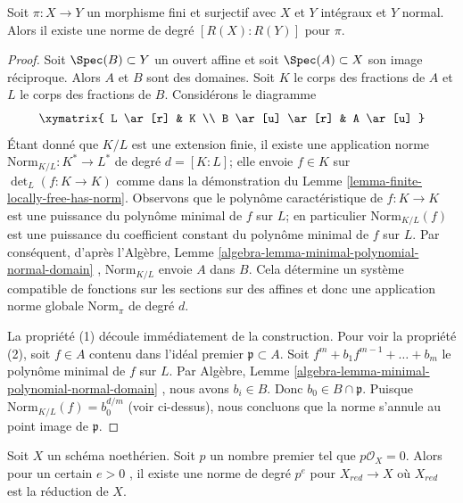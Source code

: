 \begin{lemma}
\label{lemma-norm-in-normal-case}
Soit  $\pi : X \to Y$  un morphisme fini et surjectif avec  $X$  et  $Y$ 
intégraux et  $Y$  normal. Alors il existe une norme de degré  $[R(X) : R(Y)]$ 
pour  $\pi$.
\end{lemma}

\begin{proof}
Soit  $\Spec(B) \subset Y$  un ouvert affine et soit  $\Spec(A) \subset X$  son image réciproque.
Alors  $A$  et  $B$  sont des domaines. Soit  $K$  le corps
des fractions de  $A$  et  $L$  le corps des fractions de
 $B$. Considérons le diagramme
$$
\xymatrix{
L \ar[r] & K \\
B \ar[u] \ar[r] & A \ar[u]
}
$$
Étant donné que  $K/L$  est une extension finie, il existe une application
norme  $\text{Norm}_{K/L} : K^* \to L^*$  de degré  $d = [K : L]$; elle envoie  $f \in K$ 
sur  $\det_L(f : K \to K)$  comme dans la démonstration du Lemme  \ref{lemma-finite-locally-free-has-norm}. Observons que
le polynôme caractéristique de  $f : K \to K$  est une puissance du polynôme minimal
de  $f$  sur  $L$; en particulier  $\text{Norm}_{K/L}(f)$  est une puissance du
coefficient constant du polynôme minimal de  $f$  sur  $L$. Par
conséquent, d’après l’Algèbre, Lemme  \ref{algebra-lemma-minimal-polynomial-normal-domain} ,  $\text{Norm}_{K/L}$  envoie  $A$ 
dans  $B$. Cela détermine un système compatible de fonctions sur les
sections sur des affines et donc une application norme globale  $\text{Norm}_\pi$  de
degré  $d$.

\medskip\noindent
La propriété (1) découle immédiatement de la construction. Pour voir la propriété
(2), soit  $f \in A$  contenu dans l'idéal premier  $\mathfrak p \subset A$. Soit
 $f^m + b_1 f^{m - 1} + \ldots + b_m$  le polynôme minimal de  $f$  sur  $L$. Par Algèbre,
Lemme  \ref{algebra-lemma-minimal-polynomial-normal-domain} , nous avons  $b_i \in B$. Donc  $b_0 \in B \cap \mathfrak p$. Puisque
 $\text{Norm}_{K/L}(f) = b_0^{d/m}$  (voir ci-dessus), nous concluons que la norme s'annule au point image
de  $\mathfrak p$.
\end{proof}

\begin{lemma}
\label{lemma-Frobenius-gives-norm-for-reduction}
Soit  $X$  un schéma noethérien. Soit  $p$  un nombre premier tel
que  $p\mathcal{O}_X = 0$. Alors pour un certain  $e > 0$ , il existe une norme de degré
 $p^e$  pour  $X_{red} \to X$  où  $X_{red}$  est la réduction de  $X$.
\end{lemma}

